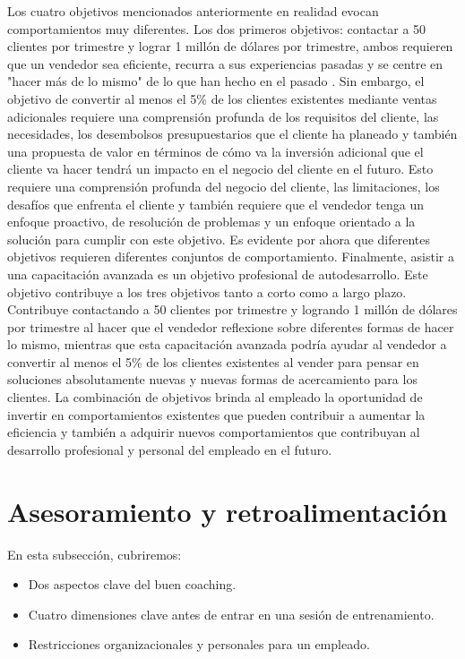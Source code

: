 \documentclass[10pt]{book}
\begin{document}
Los cuatro objetivos mencionados anteriormente en realidad evocan comportamientos muy diferentes. Los dos primeros objetivos: contactar a 50 clientes por trimestre y lograr 1 millón de dólares por trimestre, ambos requieren que un vendedor sea eficiente, recurra a sus experiencias pasadas y se centre en "hacer más de lo mismo" de lo que han hecho en el pasado . Sin embargo, el objetivo de convertir al menos el 5\% de los clientes existentes mediante ventas adicionales requiere una comprensión profunda de los requisitos del cliente, las necesidades, los desembolsos presupuestarios que el cliente ha planeado y también una propuesta de valor en términos de cómo va la inversión adicional que el cliente va hacer tendrá un impacto en el negocio del cliente en el futuro. Esto requiere una comprensión profunda del negocio del cliente, las limitaciones, los desafíos que enfrenta el cliente y también requiere que el vendedor tenga un enfoque proactivo, de resolución de problemas y un enfoque orientado a la solución para cumplir con este objetivo. Es evidente por ahora que diferentes objetivos requieren diferentes conjuntos de comportamiento. Finalmente, asistir a una capacitación avanzada es un objetivo profesional de autodesarrollo. Este objetivo contribuye a los tres objetivos tanto a corto como a largo plazo. Contribuye contactando a 50 clientes por trimestre y logrando 1 millón de dólares por trimestre al hacer que el vendedor reflexione sobre diferentes formas de hacer lo mismo, mientras que esta capacitación avanzada podría ayudar al vendedor a convertir al menos el 5\% de los clientes existentes al vender para pensar en soluciones absolutamente nuevas y nuevas formas de acercamiento para los clientes. La combinación de objetivos brinda al empleado la oportunidad de invertir en comportamientos existentes que pueden contribuir a aumentar la eficiencia y también a adquirir nuevos comportamientos que contribuyan al desarrollo profesional y personal del empleado en el futuro.
\section{Asesoramiento y retroalimentación}
En esta subsección, cubriremos:
\begin{itemize}
\item Dos aspectos clave del buen coaching.
\item Cuatro dimensiones clave antes de entrar en una sesión de entrenamiento.
\item Restricciones organizacionales y personales para un empleado.
\end{itemize}
\end{document}
